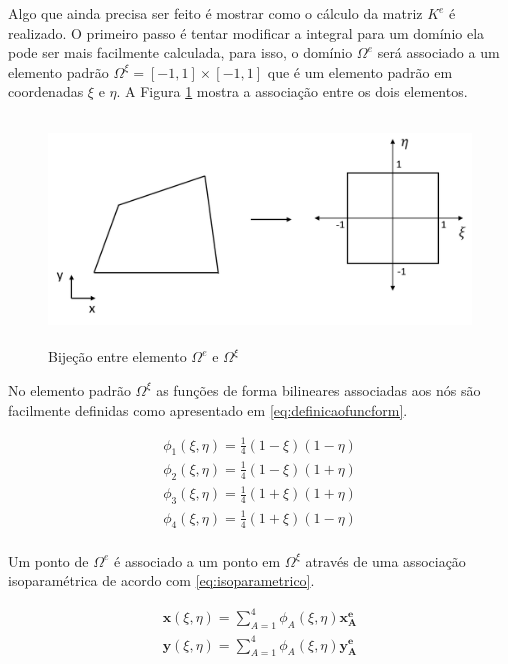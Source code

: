 Algo que ainda precisa ser feito é mostrar como o cálculo da matriz $K^e$ é realizado. O primeiro passo é tentar modificar a integral para um domínio ela pode ser mais facilmente calculada, para isso, o domínio $\Omega^e$ será associado a um elemento padrão  $\Omega^\xi = [-1,1]\times[-1,1]$ que é um elemento padrão em coordenadas $\xi$ e $\eta$. A Figura \ref{fig:bijecaoelemento} mostra a associação entre os dois elementos.


\begin{figure}[!htbp]
\centering
\includegraphics[height=6cm]{chap01/figs/elementopadrao.png}
\caption{Bijeção entre elemento $\Omega^e$ e $\Omega^\xi$}
\label{fig:bijecaoelemento}
\end{figure}


No elemento padrão $\Omega^\xi$ as funções de forma bilineares associadas aos nós são facilmente definidas como apresentado em \eqref{eq:definicaofuncform}.


\begin{equation}
\begin{matrix}\label{eq:definicaofuncform}
\phi_1(\xi, \eta) = \frac{1}{4} (1-\xi)(1-\eta) \\
\phi_2(\xi, \eta) = \frac{1}{4} (1-\xi)(1+\eta) \\
\phi_3(\xi, \eta) = \frac{1}{4} (1+\xi)(1+\eta) \\
\phi_4(\xi, \eta) = \frac{1}{4} (1+\xi)(1-\eta) \\
\end{matrix}
\end{equation}


Um ponto de $\Omega^e$ é associado a um ponto em $\Omega^\xi$ através de uma associação isoparamétrica de acordo com \eqref{eq:isoparametrico}.


\begin{equation}\label{eq:isoparametrico}
\begin{matrix}
\mathbf{x}(\xi, \eta) = \sum_{A=1}^{4} \phi_A(\xi, \eta) \mathbf{x^e_A} \\
\mathbf{y}(\xi, \eta) = \sum_{A=1}^{4} \phi_A(\xi, \eta) \mathbf{y^e_A}
\end{matrix}
\end{equation}

